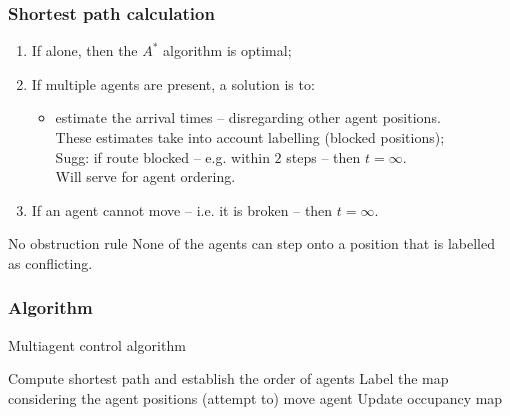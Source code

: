 \documentclass[12pt,aspectratio=169]{beamer}
\begin{document}
\begin{frame}[t]
  \frametitle{Shortest path calculation}

\begin{enumerate}
\item If alone, then the $A^*$ algorithm is optimal;
\vfill
\item If multiple agents are present, a solution is to:
  \begin{itemize}
  \item estimate the arrival times -- disregarding \alert{other agent positions}.\\
  \hfill These estimates take into account labelling (blocked positions);\\
  \hfill Sugg: if route blocked -- e.g. within $2$ steps -- then $t=\infty$.\\
  \hfill Will serve for agent ordering.
  \end{itemize}
\vfill
\item If an agent cannot move -- i.e. it is broken -- then $t=\infty$.
\end{enumerate}

\vfill
\vfill

\begin{block}{No obstruction rule}
  None of the agents can step onto a position that is labelled as conflicting.
\end{block}

\end{frame}

\begin{frame}[fragile,t]
  \frametitle{Algorithm}

\vspace*{-.5cm}
\hfill
\begin{minipage}{.8\linewidth}
  \begin{alertblock}{Multiagent control algorithm}
  \begin{algorithmic}[1]
  \Statex
  \State Compute shortest path and establish the order of agents
  \Statex {}
  \State Label the map considering the agent positions
  \Statex {}
    \State (attempt to) move agent
    \Statex {}
    \State Update occupancy map
  \EndFor  
  \EndWhile
  \end{algorithmic}
  \end{alertblock}
\end{minipage}

\end{frame}
\end{document}
